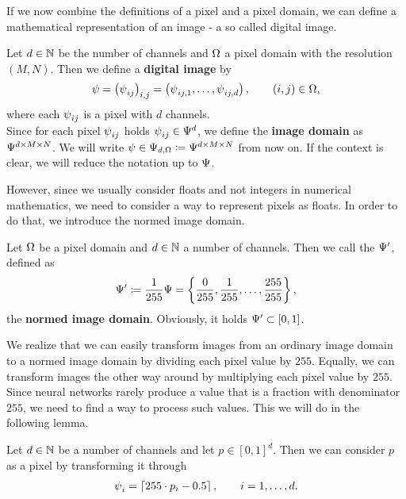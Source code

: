 If we now combine the definitions of a pixel and a pixel domain, we can define a mathematical representation of an image - a so called digital image.


\begin{definition}\label{def:image}
Let $d\in\N$ be the number of channels and $\O$ a pixel domain with the resolution $(M,N)$. Then we define a \textbf{digital image} by
\begin{align*}
\p=\left(\p_{ij}\right)_{i,j} = \left(\p_{ij,1},\ldots,\p_{ij,d} \right),\qquad (i,j)\in\O,
\end{align*}
where each $\p_{ij}$ is a pixel with $d$ channels.\\
Since for each pixel $\p_{ij}$ holds $\p_{ij}\in\P^d$, we define the \textbf{image domain} as $\P^{d\times M\times N}$. We will write $\p\in\P_{d,\O}\coloneqq \P^{d \times M\times N}$ from now on. If the context is clear, we will reduce the notation up to $\P$.
\end{definition}


However, since we usually consider floats and not integers in numerical mathematics, we need to consider a way to represent pixels as floats. In order to do that, we introduce the normed image domain.


\begin{definition}
Let $\O$ be a pixel domain and  $d\in\N$ a number of channels. Then we call the $\P^\prime$, defined as
\begin{align*}
\P^\prime \coloneqq \frac{1}{255} \P = \left\{\frac{0}{255}, \frac{1}{255}, \ldots, \frac{255}{255} \right\},
\end{align*}
the \textbf{normed image domain}. Obviously, it holds $\P^\prime \subset [0,1]$.
\end{definition}

We realize that we can easily transform images from an ordinary image domain to a normed image domain by dividing each pixel value by $255$. Equally, we can transform images the other way around by multiplying each pixel value by $255$.\\
Since neural networks rarely produce a value that is a fraction with denominator $255$, we need to find a way to process such values. This we will do in the following lemma.


\begin{lemma}
Let $d\in\N$ be a number of channels and let $p\in [0,1]^d$. Then we can consider $p$ as a pixel by transforming it through
\begin{align*}
\p_i = \left\lceil 255 \cdot p_i - 0.5 \right\rceil, \qquad i=1,\ldots,d.
\end{align*}
\end{lemma}

